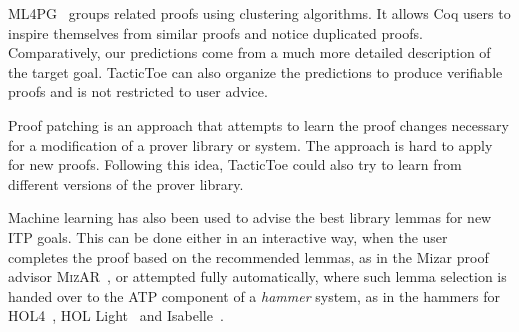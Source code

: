\documentclass[runningheads,a4paper,draft]{svjour3}
\newcommand{\todoi}[1]{\todo[inline]{#1}}
\def\holfour{\textsf{HOL4}\xspace}
\def\isabelle{\textsf{Isabelle}\xspace}
\def\hollight{\textsf{HOL Light}\xspace}
\def\coq{\textsf{Coq}\xspace}
\def\holyhammer{\textsf{HOL(y)Hammer}\xspace}
\def\sledgehammer{\textsf{Sledgehammer}\xspace}
\def\tactictoe{\textsf{TacticToe}\xspace}
\begin{document}
\textsf{ML4PG}~\cite{DBLP:journals/corr/abs-1212-3618,DBLP:journals/mics/HerasK14}
groups related proofs using clustering
algorithms. It allows \coq users to inspire themselves from similar proofs and
notice duplicated proofs. Comparatively, our predictions come from a much more
detailed description of the target goal. \tactictoe can also organize the
predictions to produce verifiable proofs and is not restricted to user
advice.


%
Proof patching \cite{RingerYLG18} is an approach that attempts to learn the
proof changes necessary for a modification of a prover library or system. The
approach is hard to apply for new proofs. Following this idea, \tactictoe 
could also try to learn from different versions of the prover library.


Machine learning has also been used to advise the best library lemmas for new
ITP goals.
This can be done either in an interactive way, when the user completes the
proof based on the recommended lemmas, as in the Mizar proof advisor
\textsc{MizAR}~\cite{Urb04-MPTP0,mizAR40}, or attempted fully automatically, where such lemma
selection is handed over to the ATP component of a \emph{hammer}
system, as in the hammers for \holfour~\cite{tgck-cpp15}, \hollight~\cite{holyhammer} and \isabelle~\cite{BlanchetteGKKU16}.
\end{document}
